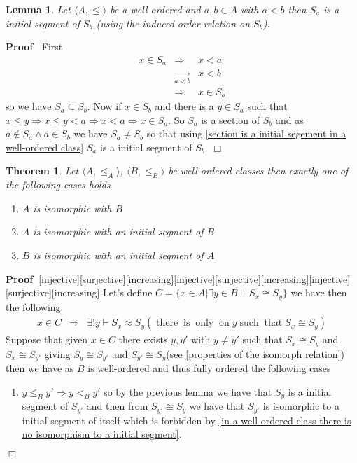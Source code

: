 \documentclass{book}
\newcommand{\Rightarrowlim}{\mathop{\rightarrow}\limits}
\newcommand{\nin}{\not\in}
\newcommand{\nobracket}{}
\newcommand{\tmop}[1]{\ensuremath{\operatorname{#1}}}
\newenvironment{proof}{\noindent\textbf{Proof\ }}{\hspace*{\fill}$\Box$\medskip}
\newtheorem{lemma}{Lemma}
\newtheorem{theorem}{Theorem}
\begin{document}
{{\begin{lemma}
  Let $\langle A, \leqslant \rangle$ be a well-ordered and $a, b \in A$ with
  $a < b$ then $S_a$ is a initial segment of $S_b$ (using the induced order
  relation on $S_b$).
\end{lemma}

\begin{proof}
  First
  \begin{eqnarray*}
    x \in S_a & \Rightarrow & x < a\\
    & \Rightarrowlim_{a < b} & x < b\\
    & \Rightarrow & x \in S_b
  \end{eqnarray*}
  so we have $S_a \subseteq S_b$. Now if $x \in S_b$ and there is a $y \in
  S_a$ such that $x \leqslant y \Rightarrow x \leqslant y < a \Rightarrow x <
  a \Rightarrow x \in S_a$. So $S_a$ is a section of $S_b$ and as $a \nin S_a
  \wedge a \in S_b$ we have $S_a \neq S_b$ so that using \ref{section is a
  initial segement in a well-ordered class} $S_a$ is a initial segment of
  $S_b$.
\end{proof}

\begin{theorem}
  \label{relation of well ordered classes}Let $\langle A, \leqslant_A
  \rangle$, $\langle B, \leqslant_B \rangle$ be well-ordered classes then
  exactly one of the following cases holds
  \begin{enumerate}
    \item $A$ is isomorphic with $B$
    
    \item $A$ is isomorphic with an initial segment of $B$
    
    \item $B$ is isomorphic with an initial segment of $A$
  \end{enumerate}
\end{theorem}

\begin{proof}[injective][surjective][increasing][injective][surjective][increasing][injective][surjective][increasing]
  Let's define $C = \{ x \in A | \exists y \in B \vdash S_x \cong S_y
  \nobracket \}$ we have then the following
  \begin{eqnarray*}
    x \in C & \Rightarrow & \exists !y \vdash S_x \approx S_y  (\tmop{there}
    \tmop{is} \tmop{only} \tmop{on} y \tmop{such} \tmop{that} S_x \cong S_y)
  \end{eqnarray*}
  Suppose that given $x \in C$ there exists $y, y'$ with $y \neq y'$ such that
  $S_x \cong S_y$ and $S_x \cong S_{y'}$ giving $S_y \cong S_{y'}$ and $S_{y'}
  \cong S_y$(see \ref{properties of the isomorph relation}) then we have as
  $B$ is well-ordered and thus fully ordered the following cases
  \begin{enumerate}
    \item $y \leqslant_B y' \Rightarrow y <_B y'$ so by the previous lemma we
    have that $S_y$ is a initial segment of $S_{y'}$ and then from $S_{y'}
    \cong S_y$ we have that $S_{y'}$ is isomorphic to a initial segment of
    itself which is forbidden by \ref{in a well-ordered class there is no
    isomorphism to a initial segment}.
    

\end{enumerate}
\end{proof}}}
\end{document}
